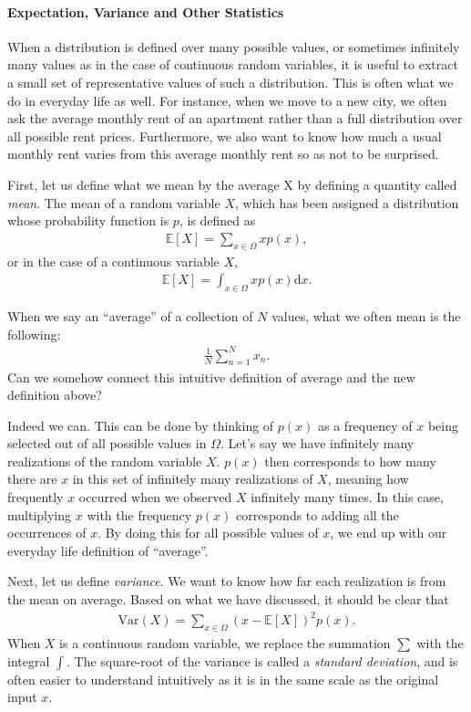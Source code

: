\documentclass{report}
\newcommand{\E}[0]{\mathbb{E}}
\newcommand{\dd}[1]{\ensuremath{\mbox{d}#1}}
\begin{document}
\paragraph{Expectation, Variance and Other Statistics}

When a distribution is defined over many possible values, or sometimes
infinitely many values as in the case of continuous random variables, it is
useful to extract a small set of representative values of such a distribution.
This is often what we do in everyday life as well. For instance, when we move to
a new city, we often ask the average monthly rent of an apartment rather than a
full distribution over all possible rent prices. Furthermore, we also want to
know how much a usual monthly rent varies from this average monthly rent so as
not to be surprised. 

First, let us define what we mean by the average X by defining a quantity called
{\it mean}. The mean of a random variable $X$, which has been assigned a
distribution whose probability function is $p$, is defined as
\begin{align*}
    \E\left[ X \right] = \sum_{x \in \Omega} x p(x),
\end{align*}
or in the case of a continuous variable $X$,
\begin{align*}
    \E\left[ X \right] = \int_{x \in \Omega} x p(x) \dd x.
\end{align*}

When we say an ``average'' of a collection of $N$ values, what we often mean is
the following:
\begin{align*}
    \frac{1}{N} \sum_{n=1}^N x_n.
\end{align*}
Can we somehow connect this intuitive definition of average and the new
definition above? 

Indeed we can. This can be done by thinking of $p(x)$ as a frequency of $x$
being selected out of all possible values in $\Omega$. Let's say we have
infinitely many realizations of the random variable $X$. $p(x)$ then corresponds
to how many there are $x$ in this set of infinitely many realizations of $X$,
meaning how frequently $x$ occurred when we observed $X$ infinitely many times.
In this case, multiplying $x$ with the frequency $p(x)$ corresponds to adding
all the occurrences of $x$. By doing this for all possible values of $x$, we end
up with our everyday life definition of ``average''.

Next, let us define {\it variance}. We want to know how far each realization is
from the mean on average. Based on what we have discussed, it should be clear
that
\begin{align*}
    \text{Var}(X) = \sum_{x \in \Omega} (x - \E\left[ X \right])^2 p(x).
\end{align*}
When $X$ is a continuous random variable, we replace the summation $\sum$ with
the integral $\int$. The square-root of the variance is called a {\it standard
deviation}, and is often easier to understand intuitively as it is in the same
scale as the original input $x$. 
\end{document}
